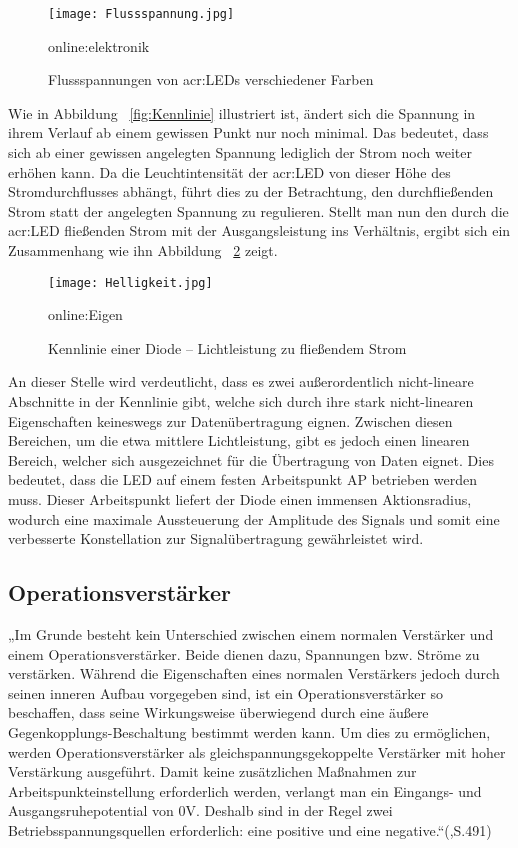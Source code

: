 \begin{figure}[H]
	\centering
	\texttt{[image: Flussspannung.jpg]}
	\caption[Flussspannungen von \gls{acr:LED}s verschiedener Farben]{Flussspannungen von \gls{acr:LED}s verschiedener Farben} 
	\gls{online:elektronik}
	\label{fig:Flussspannung}
\end{figure}

Wie in Abbildung ~\ref{fig:Kennlinie} illustriert ist, ändert sich die Spannung in ihrem Verlauf
ab einem gewissen Punkt nur noch minimal. Das bedeutet, dass sich ab einer gewissen
angelegten Spannung lediglich der Strom noch weiter erhöhen kann. Da die
Leuchtintensität der \gls{acr:LED} von dieser Höhe des Stromdurchflusses abhängt, führt dies zu der
Betrachtung, den durchfließenden Strom statt der angelegten Spannung zu regulieren.
Stellt man nun den durch die \gls{acr:LED} fließenden Strom mit der Ausgangsleistung
ins Verhältnis, ergibt sich ein Zusammenhang wie ihn Abbildung ~\ref{fig:Helligkeit} zeigt. 

\begin{figure}[H]
	\centering
	\texttt{[image: Helligkeit.jpg]}
	\caption[Kennlinie einer Diode – Lichtleistung zu fließendem Strom]{Kennlinie einer Diode – Lichtleistung zu fließendem Strom} 
	\gls{online:Eigen}
	\label{fig:Helligkeit}
\end{figure}

An dieser Stelle wird verdeutlicht, dass es zwei außerordentlich nicht-lineare Abschnitte in der Kennlinie gibt, welche sich durch ihre stark nicht-linearen Eigenschaften keineswegs zur Datenübertragung eignen. Zwischen diesen Bereichen, um die etwa mittlere Lichtleistung, gibt es jedoch einen linearen Bereich, welcher sich ausgezeichnet für die Übertragung von Daten eignet. Dies bedeutet, dass die LED auf einem festen Arbeitspunkt AP betrieben werden muss. Dieser Arbeitspunkt liefert der Diode einen immensen Aktionsradius, wodurch eine maximale Aussteuerung der Amplitude des Signals und somit eine verbesserte Konstellation zur Signalübertragung gewährleistet wird.


\subsection{Operationsverstärker}
\label{subsec:OP}

„Im Grunde besteht kein Unterschied zwischen einem normalen Verstärker und einem Operationsverstärker. Beide dienen dazu, Spannungen bzw. Ströme zu verstärken. Während die Eigenschaften eines normalen Verstärkers jedoch durch seinen inneren Aufbau vorgegeben sind, ist ein Operationsverstärker so beschaffen, dass seine Wirkungsweise überwiegend durch eine äußere Gegenkopplungs-Beschaltung bestimmt werden kann. Um dies zu ermöglichen, werden Operationsverstärker als gleichspannungsgekoppelte Verstärker mit hoher Verstärkung ausgeführt. Damit keine zusätzlichen Maßnahmen zur Arbeitspunkteinstellung erforderlich werden, verlangt man ein Eingangs- und Ausgangsruhepotential von 0V. Deshalb sind in der Regel zwei Betriebsspannungsquellen erforderlich: eine positive und eine negative.“(\cite{tietzeElectronicCircuits2008},S.491)

